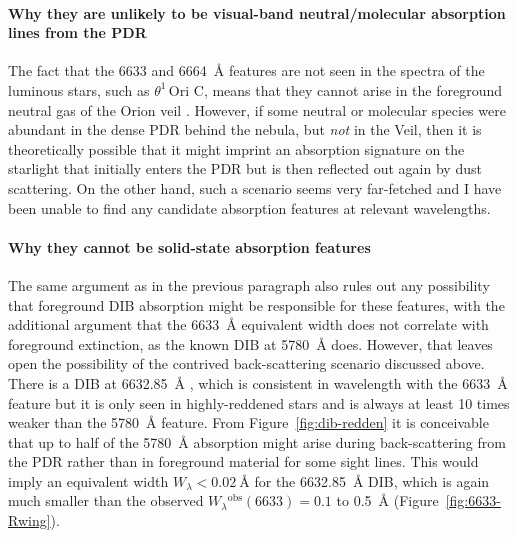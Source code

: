 \documentclass[useAMS, usenatbib, a4paper]{mnras}
\def\th#1#2{\ensuremath{\theta^{#1}\,\text{Ori~#2}}}
\newcommand\observed{\ensuremath{^{\text{obs}}}}
\begin{document}
\paragraph*{Why they are unlikely to be visual-band
  neutral/molecular absorption lines from the PDR}
\label{sec:cannot-be-abs}

The fact that the \num{6633} and \SI{6664}{\angstrom} features are not seen
in the spectra of the luminous stars, such as \th1C,
means that they cannot arise in the foreground neutral gas of the Orion veil
\citep{Abel:2004a, Abel:2019a}.
However, if some neutral or molecular species were abundant in the dense PDR behind the nebula,
but \emph{not} in the Veil,
then it is theoretically possible that it might imprint an absorption signature
on the starlight that initially enters the PDR but is then reflected out again
by dust scattering.
On the other hand,
such a scenario seems very far-fetched and I have been unable to find
any candidate absorption features at relevant wavelengths.

\paragraph*{Why they cannot be solid-state absorption features}
\label{sec:cannot-be-solid}

The same argument as in the previous paragraph also rules out any possibility
that foreground DIB absorption might be responsible for these features,
with the additional argument that the \SI{6633}{\angstrom}
equivalent width does not correlate with foreground extinction,
as the known DIB at \SI{5780}{\angstrom} does.
However, that leaves open the possibility of the contrived back-scattering scenario discussed above. 
There is a DIB at \SI{6632.85}{\angstrom} \citep{Galazutdinov:2000a},
which is consistent in wavelength with the \SI{6633}{\angstrom} feature
but it is only seen in highly-reddened stars
and is always at least 10 times weaker than the \SI{5780}{\angstrom} feature.
From Figure~\ref{fig:dib-redden} it is conceivable that up to half of the
\SI{5780}{\angstrom} absorption might arise during back-scattering from the PDR rather than in foreground material for some sight lines. 
This would imply an equivalent width \(W_\lambda < \SI{0.02}{\angstrom}\)
for the \SI{6632.85}{\angstrom} DIB,
which is again much smaller than the observed \(W_\lambda\observed(6633) = 0.1\)
to \SI{0.5}{\angstrom} (Figure~\ref{fig:6633-Rwing}).


\end{document}
